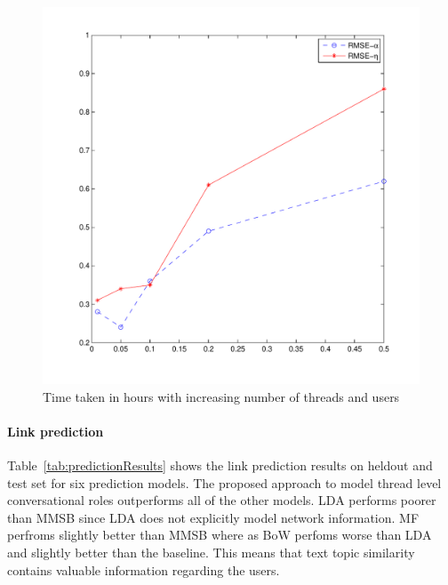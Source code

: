 \documentclass{sig-alternate}
\begin{document}
\begin{figure}
\centering
  \includegraphics[width=0.7\linewidth]{synth.pdf}
\caption{\small{Time taken in hours with increasing number of threads and users}}
\label{fig:syntheticScalability}
\end{figure}
 
\vspace*{-0.5\baselineskip}
\paragraph{Link prediction} Table~\ref{tab:predictionResults} shows the link
prediction results on heldout and test set for six prediction
models. The proposed approach to model thread 
level conversational roles outperforms
all of the other models. LDA performs poorer than MMSB since LDA does not 
explicitly model network information. MF perfroms slightly better than MMSB 
where as BoW perfoms worse than LDA and slightly better than the baseline. 
This means that text topic similarity contains valuable information regarding 
the users.

\vspace*{-0.5\baselineskip}
\end{document}
